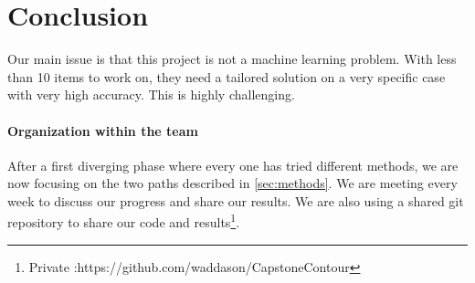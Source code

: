 \documentclass[11pt]{article}
\begin{document}
\section{Conclusion}
Our main issue is that this project is not a machine learning problem. 
With less than 10 items to work on, they need a tailored solution on a very specific case with very high accuracy. This is highly challenging.

\paragraph{Organization within the team}
After a first diverging phase where every one has tried different methods, we are now focusing on the two paths described in \cref{sec:methods}. We are meeting every 
week to discuss our progress and share our results. We are also using a shared git repository to share our code and results\footnote{Private :https://github.com/waddason/CapstoneContour}.



\end{document}
